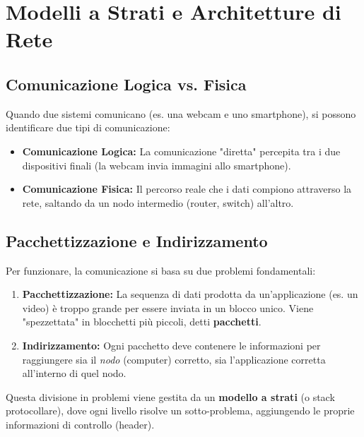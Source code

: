 \documentclass[../main.tex]{subfiles}
\begin{document}
\section{Modelli a Strati e Architetture di Rete}

\subsection{Comunicazione Logica vs. Fisica}
Quando due sistemi comunicano (es. una webcam e uno smartphone), si possono identificare due tipi di comunicazione:
\begin{itemize}
    \item \textbf{Comunicazione Logica:} La comunicazione "diretta" percepita tra i due dispositivi finali (la webcam invia immagini allo smartphone).
    \item \textbf{Comunicazione Fisica:} Il percorso reale che i dati compiono attraverso la rete, saltando da un nodo intermedio (router, switch) all'altro.
\end{itemize}

\subsection{Pacchettizzazione e Indirizzamento}
Per funzionare, la comunicazione si basa su due problemi fondamentali:
\begin{enumerate}
    \item \textbf{Pacchettizzazione:} La sequenza di dati prodotta da un'applicazione (es. un video) è troppo grande per essere inviata in un blocco unico. Viene "spezzettata" in blocchetti più piccoli, detti \textbf{pacchetti}.
    \item \textbf{Indirizzamento:} Ogni pacchetto deve contenere le informazioni per raggiungere sia il \emph{nodo} (computer) corretto, sia l'applicazione corretta all'interno di quel nodo.
\end{enumerate}

Questa divisione in problemi viene gestita da un \textbf{modello a strati} (o stack protocollare), dove ogni livello risolve un sotto-problema, aggiungendo le proprie informazioni di controllo (header).
\end{document}
